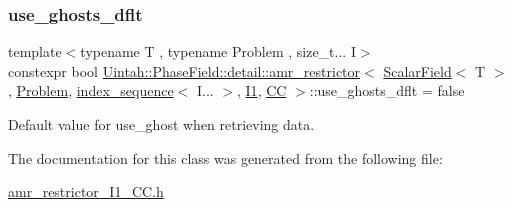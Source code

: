 \subsubsection{\texorpdfstring{use\+\_\+ghosts\+\_\+dflt}{use\_ghosts\_dflt}}
{\footnotesize\ttfamily template$<$typename T , typename Problem , size\+\_\+t... I$>$ \\
constexpr bool \hyperlink{classUintah_1_1PhaseField_1_1detail_1_1amr__restrictor}{Uintah\+::\+Phase\+Field\+::detail\+::amr\+\_\+restrictor}$<$ \hyperlink{structUintah_1_1PhaseField_1_1ScalarField}{Scalar\+Field}$<$ T $>$, \hyperlink{classUintah_1_1PhaseField_1_1Problem}{Problem}, \hyperlink{namespaceUintah_1_1PhaseField_a237de804d99512e50613aff7c94a9461}{index\+\_\+sequence}$<$ I... $>$, \hyperlink{namespaceUintah_1_1PhaseField_a547ce3002aa97fbd3ef3192a6eec8406a66f19efe774b0d2b6e5844eb2d83d305}{I1}, \hyperlink{namespaceUintah_1_1PhaseField_a33d355affda78a83f45755ba8388cedda22303704507d024d1d6508ed9859a85a}{CC} $>$\+::use\+\_\+ghosts\+\_\+dflt = false\hspace{0.3cm}{\ttfamily [static]}}



Default value for use\+\_\+ghost when retrieving data. 



The documentation for this class was generated from the following file\+:\begin{DoxyCompactItemize}
\item 
\hyperlink{amr__restrictor__I1__CC_8h}{amr\+\_\+restrictor\+\_\+\+I1\+\_\+\+C\+C.\+h}\end{DoxyCompactItemize}
